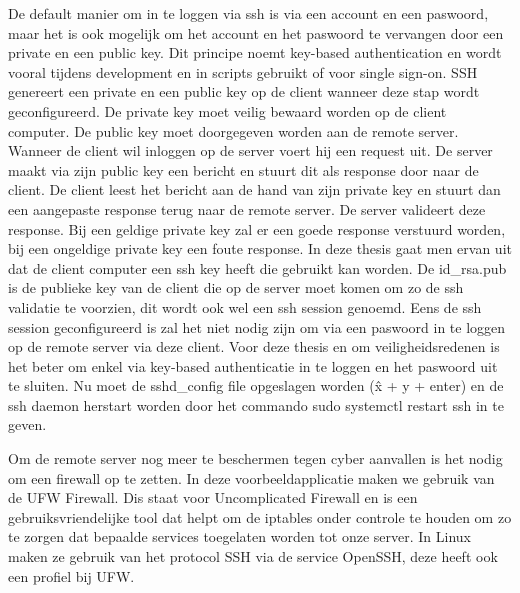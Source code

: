     De default manier om in te loggen via ssh is via een account en een paswoord, maar het is ook mogelijk om het account en het paswoord te vervangen door een private en een public key. Dit principe noemt key-based authentication en wordt vooral tijdens development en in scripts gebruikt of voor single sign-on. SSH genereert een private en een public key op de client wanneer deze stap wordt geconfigureerd. De private key moet veilig bewaard worden op de client computer. De public key moet doorgegeven worden aan de remote server. Wanneer de client wil inloggen op de server voert hij een request uit. De server maakt via zijn public key een bericht en stuurt dit als response door naar de client. De client leest het bericht aan de hand van zijn private key en stuurt dan een aangepaste response terug naar de remote server. De server valideert deze response. Bij een geldige private key zal er een goede response verstuurd worden, bij een ongeldige private key een foute response.
    In deze thesis gaat men ervan uit dat de client computer een ssh key heeft die gebruikt kan worden. %
    De id\_rsa.pub is de publieke key van de client die op de server moet komen om zo de ssh validatie te voorzien, dit wordt ook wel een ssh session genoemd. Eens de ssh session geconfigureerd is zal het niet nodig zijn om via een paswoord in te loggen op de remote server via deze client.
    Voor deze thesis en om veiligheidsredenen is het beter om enkel via key-based authenticatie in te loggen en het paswoord uit te sluiten.
    Nu moet de sshd\_config file opgeslagen worden (\^x + y + enter) en de ssh daemon herstart worden door het commando sudo systemctl restart ssh in te geven.
    
    Om de remote server nog meer te beschermen tegen cyber aanvallen is het nodig om een firewall op te zetten. In deze voorbeeldapplicatie maken we gebruik van de UFW Firewall. Dis staat voor Uncomplicated Firewall en is een gebruiksvriendelijke tool dat helpt om de iptables onder controle te houden om zo te zorgen dat bepaalde services toegelaten worden tot onze server.
    In Linux maken ze gebruik van het protocol SSH via de service OpenSSH, deze heeft ook een profiel bij UFW.
    
    
    
    
    
    